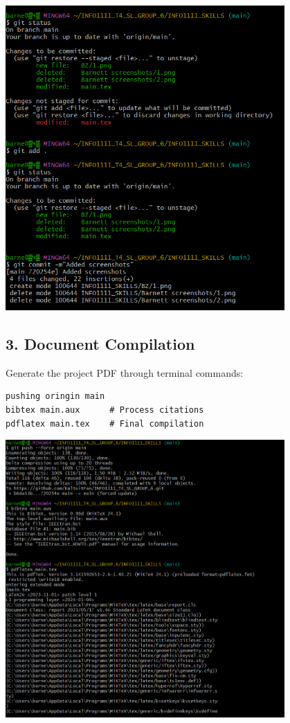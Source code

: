 \documentclass[a4paper, 11pt]{report}
\begin{document}
\begin{center}
\includegraphics[width=0.8\textwidth]{BZ/2.png}
\end{center}

\subsection*{3. Document Compilation}
Generate the project PDF through terminal commands:
\begin{verbatim}
pushing oringin main
bibtex main.aux      # Process citations
pdflatex main.tex    # Final compilation
\end{verbatim}

\begin{center}
\includegraphics[width=0.8\textwidth]{BZ/3.png}
\end{center}
\end{document}

